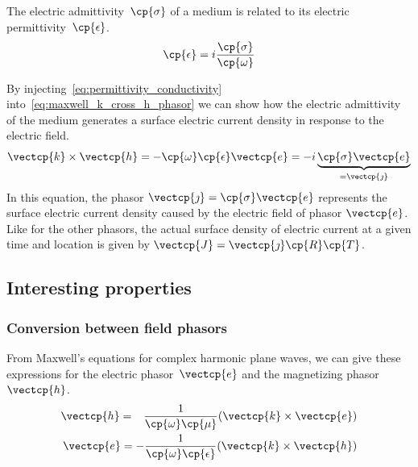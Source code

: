 \begin{refsection}
The electric admittivity~$\cp{\sigma}$ of a medium is related to its electric permittivity~$\cp{\epsilon}$.
\begin{equation}
    \cp{\epsilon} = i \frac{\cp{\sigma}}{\cp{\omega}}
    \label{eq:permittivity_conductivity}
\end{equation}

By injecting~\cref{eq:permittivity_conductivity} into~\cref{eq:maxwell_k_cross_h_phasor}
we can show how the electric admittivity of the medium generates a surface electric current density in response to the electric field.
\begin{equation}
    \vectcp{k} \times \vectcp{h}
    =
    -\cp{\omega} \cp{\epsilon} \vectcp{e}
    =
    -i
    \underbrace{\cp{\sigma} \vectcp{e}}_{= \vectcp{\jmath}}
\end{equation}
In this equation, the phasor $\vectcp{\jmath} = \cp{\sigma} \vectcp{e}$ represents the surface electric current density caused by the electric field of phasor $\vectcp{e}$.
Like for the other phasors, the actual surface density of electric current at a given time and location is given by $\vectcp{J}=\vectcp{\jmath}\cp{R}\cp{T}$.


\subsection{Interesting properties}

\subsubsection{Conversion between field phasors}
From Maxwell's equations for complex harmonic plane waves, we can give these expressions for the electric phasor~$\vectcp{e}$ and the magnetizing phasor~$\vectcp{h}$.
\begin{subequations}
    \begin{align}
        \vectcp{h} =
        \hphantom{\mathrel{-}}\frac{1}{\cp{\omega}\cp{\mu}}(\vectcp{k} \times \vectcp{e})
        \label{eq:complex_h_k_e}
        \\
        \vectcp{e} = -\frac{1}{\cp{\omega}\cp{\epsilon}}(\vectcp{k} \times \vectcp{h})
        \label{eq:complex_e_k_h}
    \end{align}
\end{subequations}


\end{refsection}
